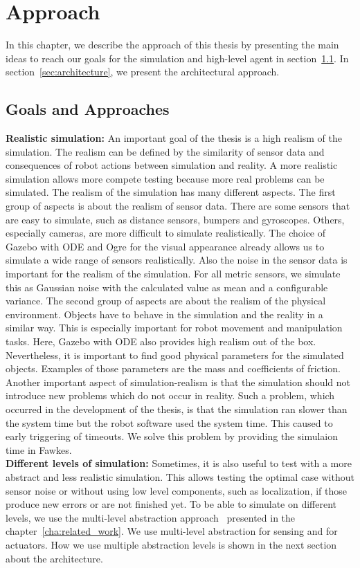 \chapter{Approach}
\label{cha:approach}
In this chapter, we describe the approach of this thesis by presenting the main ideas to reach our goals for the simulation and high-level agent in section~\ref{sec:goals_and_approaches}. In section~\ref{sec:architecture}, we present the architectural approach.

\section{Goals and Approaches}
\label{sec:goals_and_approaches}
\textbf{Realistic simulation:} An important goal of the thesis is a high realism of the simulation. The realism can be defined by the similarity of sensor data and consequences of robot actions between simulation and reality. A more realistic simulation allows more compete testing because more real problems can be simulated. The realism of the simulation has many different aspects. The first group of aspects is about the realism of sensor data. There are some sensors that are easy to simulate, such as distance sensors, bumpers and gyroscopes. Others, especially cameras, are more difficult to simulate realistically. The choice of Gazebo with ODE and Ogre for the visual appearance already allows us to simulate a wide range of sensors realistically. Also the noise in the sensor data is important for the realism of the simulation. For all metric sensors, we simulate this as Gaussian noise with the calculated value as mean and a configurable variance. The second group of aspects are about the realism of the physical environment. Objects have to behave in the simulation and the reality in a similar way. This is especially important for robot movement and manipulation tasks. Here, Gazebo with ODE also provides high realism out of the box. Nevertheless, it is important to find good physical parameters for the simulated objects. Examples of those parameters are the mass and coefficients of friction. Another important aspect of simulation-realism is that the simulation should not introduce new problems which do not occur in reality. Such a problem, which occurred in the development of the thesis, is that the simulation ran slower than the system time but the robot software used the system time. This caused to early triggering of timeouts. We solve this problem by providing the simulaion time in Fawkes.\\
\textbf{Different levels of simulation:} Sometimes, it is also useful to test with a more abstract and less realistic simulation. This allows testing the optimal case without sensor noise or without using low level components, such as localization, if those produce new errors or are not finished yet. To be able to simulate on different levels, we use the multi-level abstraction approach~\cite{MultiLevelAbstraction} presented in the chapter~\ref{cha:related_work}. We use multi-level abstraction for sensing and for actuators. How we use multiple abstraction levels is shown in the next section about the architecture.\\
